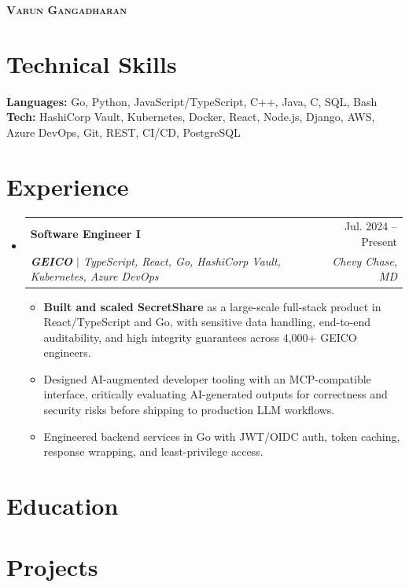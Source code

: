 \documentclass[letterpaper,11pt]{article}
\makeatletter
\newcommand{\resumeItem}[1]{\item\small{{#1 \vspace{-2pt}}}}
\newcommand{\resumeSubheading}[4]{\vspace{-2pt}\item\begin{tabular*}{0.97\textwidth}[t]{l@{\extracolsep{\fill}}r}\textbf{#1} & #2 \\ \textit{\small#3} & \textit{\small #4} \\ \end{tabular*}\vspace{-7pt}}
\newcommand{\resumeSubHeadingListStart}{\begin{itemize}[leftmargin=0.15in, label={}]}
\newcommand{\resumeSubHeadingListEnd}{\end{itemize}}
\newcommand{\resumeItemListStart}{\begin{itemize}}
\newcommand{\resumeItemListEnd}{\end{itemize}\vspace{-5pt}}
\makeatother
\begin{document}
\begin{center}\textbf{\Huge \scshape Varun Gangadharan}\end{center}

\section{Technical Skills}
\begin{itemize}[leftmargin=0.10in, label={}, topsep=2pt, itemsep=0pt]
\small{\item{
\textbf{Languages:} Go, Python, JavaScript/TypeScript, C++, Java, C, SQL, Bash \\
\textbf{Tech:} HashiCorp Vault, Kubernetes, Docker, React, Node.js, Django, AWS, Azure DevOps, Git, REST, CI/CD, PostgreSQL
}}
\end{itemize}

\section{Experience}
\resumeSubHeadingListStart
\resumeSubheading
{Software Engineer I}{Jul. 2024 -- Present}
{\textbf{GEICO} $|$ TypeScript, React, Go, HashiCorp Vault, Kubernetes, Azure DevOps}{Chevy Chase, MD}
\resumeItemListStart
\resumeItem{\textbf{Built and scaled SecretShare} as a large-scale full-stack product in React/TypeScript and Go, with sensitive data handling, end-to-end auditability, and high integrity guarantees across 4,000+ GEICO engineers.}
\resumeItem{Designed AI-augmented developer tooling with an MCP-compatible interface, critically evaluating AI-generated outputs for correctness and security risks before shipping to production LLM workflows.}
\resumeItem{Engineered backend services in Go with JWT/OIDC auth, token caching, response wrapping, and least-privilege access.}
\resumeItemListEnd
\resumeSubHeadingListEnd

\section{Education}
\section{Projects}
\end{document}
